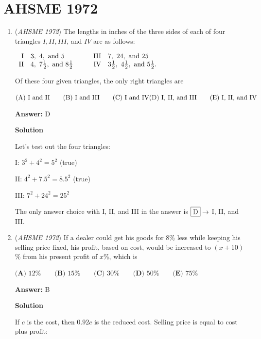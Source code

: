 \section{AHSME 1972}
        \begin{enumerate}
        	\item (\textit{AHSME 1972}) The lengths in inches of the three sides of each of four triangles $I, II, III$, and $IV$ are as follows: 


 $\begin{array}{rlrl} \hbox{I}& 3,\ 4,\ \hbox{and}\ 5\qquad & \hbox{III}& 7,\ 24,\ \hbox{and}\ 25\\  \hbox{II}& 4,\ 7\frac{1}{2},\ \hbox{and}\ 8\frac{1}{2}\qquad & \hbox{IV}& 3\frac{1}{2},\ 4\frac{1}{2},\ \hbox{and}\ 5\frac{1}{2}.\end{array}$


 Of these four given triangles, the only right triangles are 


 $\text{(A)  I and II}\qquad  \text{(B)  I and III}\qquad \text{(C)  I and IV} \quad \\ \text{(D)  I, II, and III} \qquad \text{(E)  I, II, and IV }$

 \textbf{Answer: }D



\textbf{Solution}

Let's test out the four triangles:

 I: $3^2 + 4^2 = 5^2$ (true)

 II: $4^2 + 7.5^2 = 8.5^2$ (true)

 III: $7^2 + 24^2 = 25^2$

 The only answer choice with I, II, and III in the answer is $\fbox{D} \rightarrow$ I, II, and III.

 


	\item (\textit{AHSME 1972}) If a dealer could get his goods for $8$\% less while keeping his selling price fixed, 
his profit, based on cost, would be increased to $(x+10)$\% from his present profit of $x$\%, which is


 $\textbf{(A) }12\%\qquad \textbf{(B) }15\%\qquad \textbf{(C) }30\%\qquad \textbf{(D) }50\%\qquad  \textbf{(E) }75\%$

 \textbf{Answer: }B



\textbf{Solution}

If $c$ is the cost, then $0.92c$ is the reduced cost. Selling price is equal to cost plus profit:


\end{enumerate}
